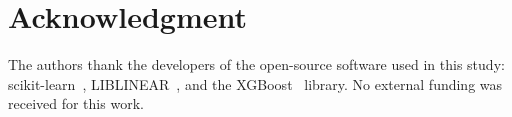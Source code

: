 \documentclass[conference]{IEEEtran}
\begin{document}
\section*{Acknowledgment}
The authors thank the developers of the open-source software used in this study: scikit-learn~\cite{sklearn}, LIBLINEAR~\cite{liblinear}, and the XGBoost~\cite{chen_xgboost} library. No external funding was received for this work.



\end{document}
